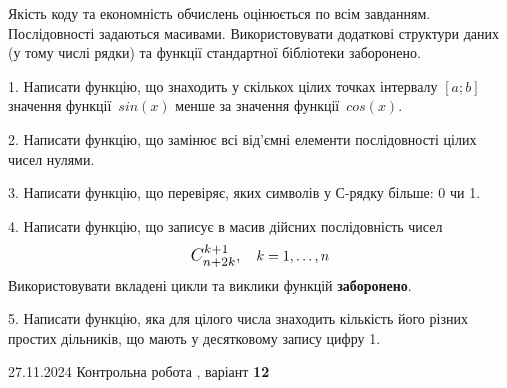 \documentclass[12pt, ukrainian]{article}
\begin{document}
{{{{{{{{{{{
Якість коду та економність обчислень оцінюється по всім завданням. Послідовності задаються масивами. Використовувати додаткові структури даних (у тому числі рядки) та функції стандартної бібліотеки заборонено.

\vspace{2mm}

\begin {large}
1. Написати функцію, що знаходить у скількох цілих точках інтервалу $[a; b]$ значення функції~$sin(x)$ менше за значення функції~$cos(x)$.

\vspace{2mm}


2. Написати функцію, що замінює всі від'ємні елементи послідовності цілих чисел нулями.

\vspace{2mm}


3. Написати функцію, що перевіряє, яких символів у С-рядку більше: 0 чи 1.

\vspace{2mm}


4. 
Написати функцію, що записує в масив дійсних послідовність чисел
$$\scalebox{1.2}{$C_{n+2k}^{k+1}$}, \quad k=1,\ldots,n$$
Використовувати вкладені цикли та виклики функцій \textbf{заборонено}.

\vspace{2mm}


5. Написати функцію, яка для цілого числа знаходить кількість його різних простих дільників, що мають у десятковому запису цифру 1.

\vspace{2mm}

\end{large}
\vspace{35mm}


{{27.11.2024 Контрольна робота , варіант  \No \textbf { 12 }\par}}


}}}}}}}}}}}
\end{document}

